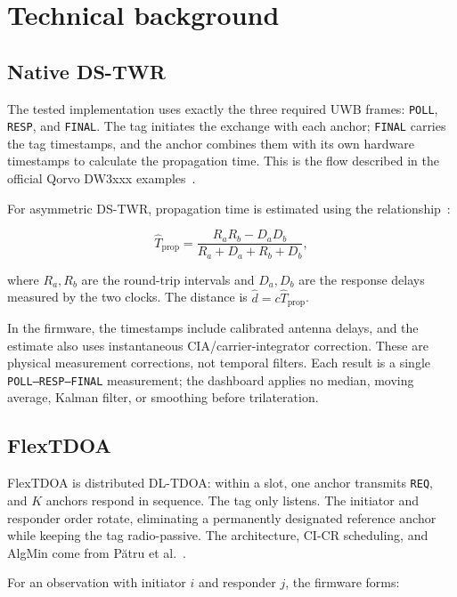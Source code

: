 \documentclass[11pt,a4paper]{article}
\begin{document}
\section{Technical background}

\subsection{Native DS-TWR}

The tested implementation uses exactly the three required UWB frames:
\texttt{POLL}, \texttt{RESP}, and \texttt{FINAL}. The tag initiates the
exchange with each anchor; \texttt{FINAL} carries the tag timestamps, and the
anchor combines them with its own hardware timestamps to calculate the
propagation time. This is the flow described in the official Qorvo DW3xxx
examples~\cite{qorvo-api}.

For asymmetric DS-TWR, propagation time is estimated using the
relationship~\cite{aps013}:

\begin{equation}
  \widehat{T}_{\mathrm{prop}} =
  \frac{R_aR_b-D_aD_b}{R_a+D_a+R_b+D_b},
\end{equation}

where $R_a,R_b$ are the round-trip intervals and $D_a,D_b$ are the response
delays measured by the two clocks. The distance is
$\widehat d=c\widehat T_{\mathrm{prop}}$.

In the firmware, the timestamps include calibrated antenna delays, and the
estimate also uses instantaneous CIA/carrier-integrator correction. These are
physical measurement corrections, not temporal filters. Each result is a
single \texttt{POLL--RESP--FINAL} measurement; the dashboard applies no
median, moving average, Kalman filter, or smoothing before trilateration.

\subsection{FlexTDOA}

FlexTDOA is distributed DL-TDOA: within a slot, one anchor transmits
\texttt{REQ}, and $K$ anchors respond in sequence. The tag only listens. The
initiator and responder order rotate, eliminating a permanently designated
reference anchor while keeping the tag radio-passive. The architecture, CI-CR
scheduling, and AlgMin come from Pătru et al.~\cite{flextdoa-paper}.

For an observation with initiator $i$ and responder $j$, the firmware forms:
\end{document}
